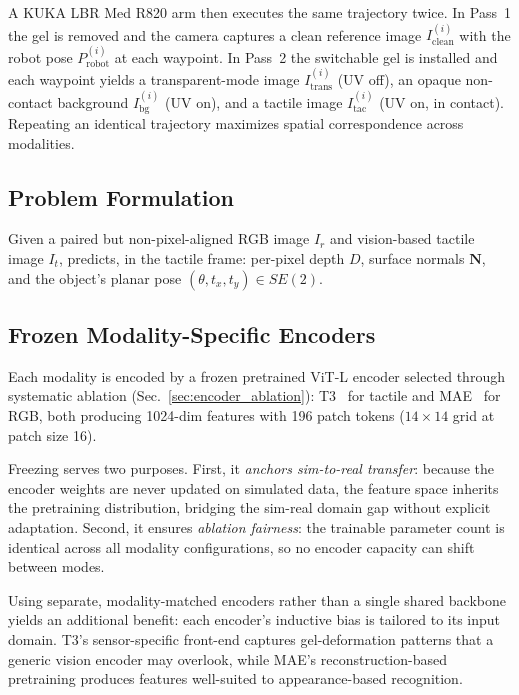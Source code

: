 A KUKA LBR Med R820 arm then executes the same trajectory twice.
In Pass~1 the gel is removed and the camera captures a clean reference image
$I_{\text{clean}}^{(i)}$ with the robot pose $P_{\text{robot}}^{(i)}$ at each
waypoint.
In Pass~2 the switchable gel is installed and each waypoint yields a
transparent-mode image $I_{\text{trans}}^{(i)}$ (UV off), an opaque
non-contact background $I_{\text{bg}}^{(i)}$ (UV on), and a tactile image
$I_{\text{tac}}^{(i)}$ (UV on, in contact).
Repeating an identical trajectory maximizes spatial correspondence across
modalities.

\subsection{Problem Formulation}
Given a paired but non-pixel-aligned RGB image $I_r$ and vision-based tactile
image $I_t$, \method{} predicts, in the tactile frame: per-pixel depth $D$,
surface normals $\mathbf{N}$, and the object's planar pose
$(\theta, t_x, t_y) \in SE(2)$.

\subsection{Frozen Modality-Specific Encoders}
\label{sec:encoders}

Each modality is encoded by a frozen pretrained ViT-L encoder selected through
systematic ablation (Sec.~\ref{sec:encoder_ablation}): T3~\cite{zhao2024transferable}
for tactile and MAE~\cite{he2022mae} for RGB, both producing 1024-dim features
with 196 patch tokens ($14{\times}14$ grid at patch size 16).

Freezing serves two purposes.
First, it \emph{anchors sim-to-real transfer}: because the encoder weights are
never updated on simulated data, the feature space inherits the pretraining
distribution, bridging the sim-real domain gap without explicit adaptation.
Second, it ensures \emph{ablation fairness}: the trainable parameter count is
identical across all modality configurations, so no encoder capacity can shift
between modes.

Using separate, modality-matched encoders rather than a single shared backbone
yields an additional benefit: each encoder's inductive bias is tailored to its
input domain. T3's sensor-specific front-end captures gel-deformation patterns
that a generic vision encoder may overlook, while MAE's reconstruction-based
pretraining produces features well-suited to appearance-based recognition.

